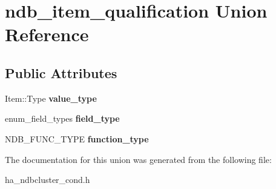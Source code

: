 \hypertarget{unionndb__item__qualification}{}\section{ndb\+\_\+item\+\_\+qualification Union Reference}
\label{unionndb__item__qualification}
\subsection*{Public Attributes}
\begin{DoxyCompactItemize}
\item 
\mbox{\label{unionndb__item__qualification_afde3dc5b98ec1c247ccc4a0e7ec7d386}} 
Item\+::\+Type {\bfseries value\+\_\+type}
\item 
\mbox{\label{unionndb__item__qualification_a3497fb7a304ed1292f7d3e339d2dc93e}} 
enum\+\_\+field\+\_\+types {\bfseries field\+\_\+type}
\item 
\mbox{\label{unionndb__item__qualification_ad874765aee0c687fd0349826dfd811f5}} 
N\+D\+B\+\_\+\+F\+U\+N\+C\+\_\+\+T\+Y\+PE {\bfseries function\+\_\+type}
\end{DoxyCompactItemize}


The documentation for this union was generated from the following file\+:\begin{DoxyCompactItemize}
\item 
ha\+\_\+ndbcluster\+\_\+cond.\+h\end{DoxyCompactItemize}
